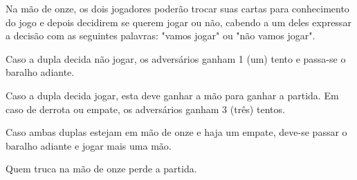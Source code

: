 \begin{article}
	Na mão de onze, os dois jogadores poderão trocar suas cartas para conhecimento do jogo e depois decidirem se querem jogar ou não, cabendo a um deles expressar a decisão com as seguintes palavras: "vamos jogar" ou "não vamos jogar".

	\begin{xparagraph}
		Caso a dupla decida não jogar, os adversários ganham 1 (um) tento e passa-se o baralho adiante.
	\end{xparagraph}

	\begin{xparagraph}
		Caso a dupla decida jogar, esta deve ganhar a mão para ganhar a partida. Em caso de derrota ou empate, os adversários ganham 3 (três) tentos.
	\end{xparagraph}

	\begin{xparagraph}
		Caso ambas duplas estejam em mão de onze e haja um empate, deve-se passar o baralho adiante e jogar mais uma mão.
	\end{xparagraph}

	\begin{xparagraph}
		Quem truca na mão de onze perde a partida.
	\end{xparagraph}
\end{article}
